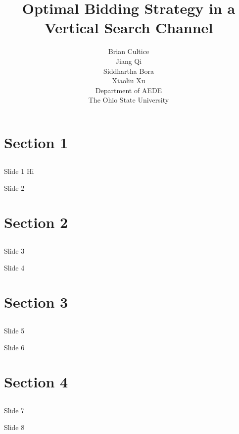 \documentclass[font=10 pt]{beamer}
\title[Optimal Bid Strategy]{Optimal Bidding Strategy in a Vertical Search Channel}  %
\date[\today]{}
\author[Bora, Cultice, Qi, Xu]{{\footnotesize Brian Cultice\\
Jiang Qi\\
Siddhartha Bora \\
Xiaoliu Xu\\
Department of AEDE\\
The Ohio State University}}
\institute[]{{\footnotesize Erdos Institute Python Bootcamp \\
\today}}
\begin{document}
\begin{frame}
\titlepage %
\end{frame}

\section{Section 1}
\subsection{}

\begin{frame}{Slide 1}
Hi

\end{frame}

\begin{frame}{Slide 2}

\end{frame}

\section{Section 2}
\subsection{}

\begin{frame}{Slide 3}

\end{frame}

\begin{frame}{Slide 4}

\end{frame}

\section{Section 3}
\subsection{}

\begin{frame}{Slide 5}

\end{frame}

\begin{frame}{Slide 6}

\end{frame}
\section{Section 4}
\subsection{}

\begin{frame}{Slide 7}

\end{frame}

\begin{frame}{Slide 8}

\end{frame}
\end{document}
